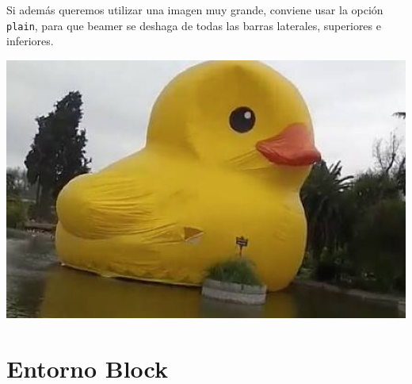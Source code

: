 \documentclass[11pt]{beamer}	%
\begin{document}
\begin{frame}
	\frametitle{\secname}	%
	
	Si además queremos utilizar una imagen muy grande, conviene usar la opción \texttt{plain}, para que beamer se deshaga de todas las barras laterales, superiores e inferiores.
\end{frame}

\begin{frame}[plain]
	\begin{center}
		\includegraphics[scale=0.35]{pobrepatito.jpg}
	\end{center}
\end{frame}

\section{Entorno Block}
\end{document}
